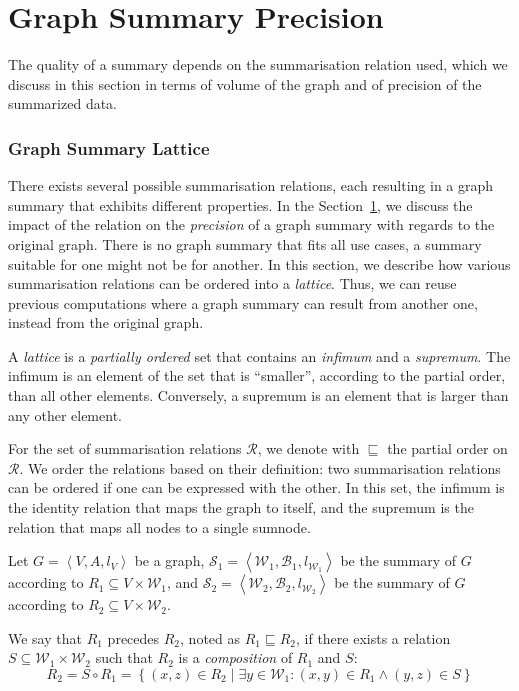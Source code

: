 \chapter{Graph Summary Precision}
\label{chap03:sec:quality}

The quality of a summary depends on the summarisation relation used, which we discuss in this section in terms of volume of the graph and of precision of the summarized data.

\subsection{Graph Summary Lattice}

There exists several possible summarisation relations, each resulting in a graph summary that exhibits different properties. In the Section~\ref{chap03:sec:quality}, we discuss the impact of the relation on the \emph{precision} of a graph summary with regards to the original graph. There is no graph summary that fits all use cases, a summary suitable for one might not be for another. In this section, we describe how various summarisation relations can be ordered into a \emph{lattice}. Thus, we can reuse previous computations where a graph summary can result from another one, instead from the original graph.

A \emph{lattice} is a \emph{partially ordered} set that contains an \emph{infimum} and a \emph{supremum}. The infimum is an element of the set that is ``smaller'', according to the partial order, than all other elements. Conversely, a supremum is an element that is larger than any other element.

For the set of summarisation relations $\mathcal{R}$, we denote with $\sqsubseteq$ the partial order on $\mathcal{R}$. We order the relations based on their definition: two summarisation relations can be ordered if one can be expressed with the other. In this set, the infimum is the identity relation that maps the graph to itself, and the supremum is the relation that maps all nodes to a single sumnode.

\begin{definition}
	Let $G=\left\langle V, A, l_V \right\rangle$ be a graph, $\mathcal{S}_1 = \left\langle \mathcal{W}_1, \mathcal{B}_1, l_{\mathcal{W}_1} \right\rangle$ be the summary of $G$ according to $R_1 \subseteq V \times \mathcal{W}_1$, and $\mathcal{S}_2 = \left\langle \mathcal{W}_2, \mathcal{B}_2, l_{\mathcal{W}_2} \right\rangle$ be the summary of $G$ according to $R_2 \subseteq V \times \mathcal{W}_2$.
	
	We say that $R_1$ precedes $R_2$, noted as $R_1 \sqsubseteq R_2$, if there exists a relation $S \subseteq \mathcal{W}_1 \times \mathcal{W}_2$ such that $R_2$ is a \emph{composition} of $R_1$ and $S$:
	$$
	R_2 = S \circ R_1 = \left\lbrace (x, z) \in R_2 \mid \exists y \in \mathcal{W}_1 : (x, y) \in R_1 \wedge (y, z) \in S \right\rbrace 
	$$
\end{definition}

